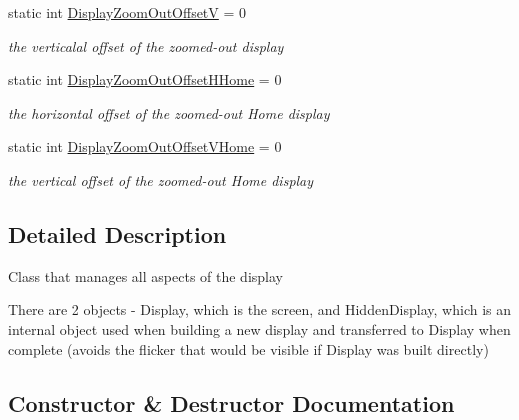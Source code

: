 \begin{DoxyCompactItemize}
\mbox{\label{class_t_display_a3c63a18e8901299ab56176c034072b1c}} 
static int \mbox{\hyperlink{class_t_display_a3c63a18e8901299ab56176c034072b1c}{Display\+Zoom\+Out\+OffsetV}} = 0
\begin{DoxyCompactList}\small\item\em the verticalal offset of the zoomed-\/out display \end{DoxyCompactList}\item 
\mbox{\label{class_t_display_a62c3d449d00b1a063a4bf7f212968e87}} 
static int \mbox{\hyperlink{class_t_display_a62c3d449d00b1a063a4bf7f212968e87}{Display\+Zoom\+Out\+Offset\+H\+Home}} = 0
\begin{DoxyCompactList}\small\item\em the horizontal offset of the zoomed-\/out \textquotesingle{}Home\textquotesingle{} display \end{DoxyCompactList}\item 
\mbox{\label{class_t_display_a758f553cef2eb9b3eee4d491454a7da9}} 
static int \mbox{\hyperlink{class_t_display_a758f553cef2eb9b3eee4d491454a7da9}{Display\+Zoom\+Out\+Offset\+V\+Home}} = 0
\begin{DoxyCompactList}\small\item\em the vertical offset of the zoomed-\/out \textquotesingle{}Home\textquotesingle{} display \end{DoxyCompactList}\end{DoxyCompactItemize}


\subsection{Detailed Description}
Class that manages all aspects of the display

There are 2 objects -\/ Display, which is the screen, and Hidden\+Display, which is an internal object used when building a new display and transferred to Display when complete (avoids the flicker that would be visible if Display was built directly) 

\subsection{Constructor \& Destructor Documentation}
\mbox{\label{class_t_display_a72cbdba53131a636da2c656f6025574b}} 
